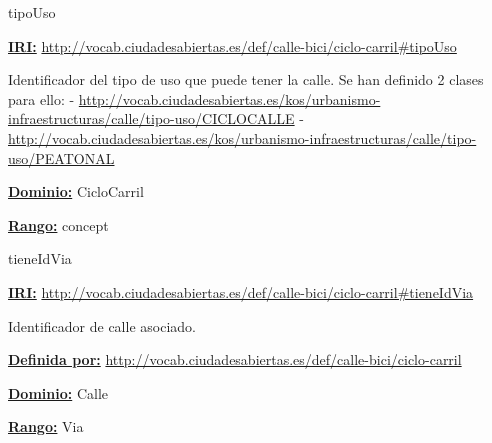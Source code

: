 \begin{mybox}{tipoUso}
\begin{flushleft}
\underline{\textbf{IRI:}}
\url{http://vocab.ciudadesabiertas.es/def/calle-bici/ciclo-carril#tipoUso}
\newline

Identificador del tipo de uso que puede tener la calle. Se han definido 2 clases para ello:
\newline -	\url{http://vocab.ciudadesabiertas.es/kos/urbanismo-infraestructuras/calle/tipo-uso/CICLOCALLE}
\newline -	 \url{http://vocab.ciudadesabiertas.es/kos/urbanismo-infraestructuras/calle/tipo-uso/PEATONAL}
\newline



\underline{\textbf{Dominio:}}
\newline CicloCarril

\underline{\textbf{Rango:}}
		concept


\end{flushleft}
\end{mybox}






\begin{mybox}{tieneIdVia}
\begin{flushleft}
\underline{\textbf{IRI:}}
\url{http://vocab.ciudadesabiertas.es/def/calle-bici/ciclo-carril#tieneIdVia}
\newline

Identificador de calle asociado.
\newline

\underline{\textbf{Definida por:}}
\url{http://vocab.ciudadesabiertas.es/def/calle-bici/ciclo-carril}
\newline

\underline{\textbf{Dominio:}}
		Calle
\newline

\underline{\textbf{Rango:}}
		Via
\newline


\end{flushleft}
\end{mybox}





